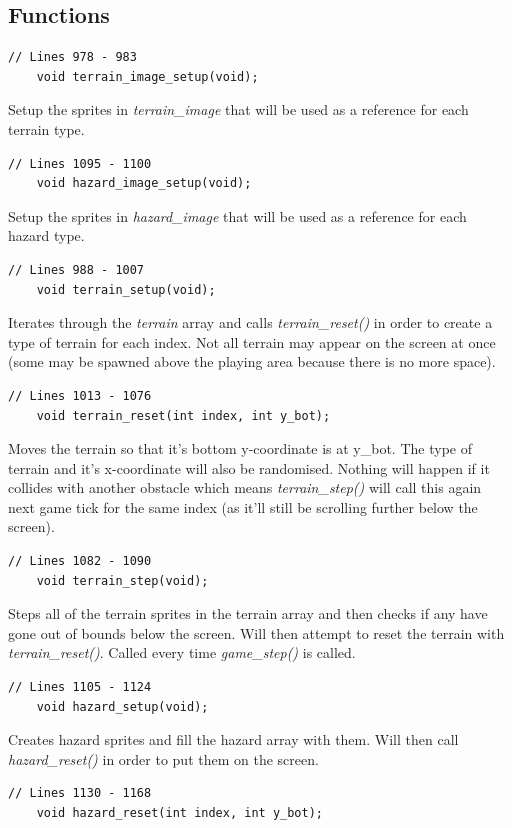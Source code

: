 \documentclass{article}
\begin{document}
\subsection*{Functions}
\begin{lstlisting}[style=CStyle]
	// Lines 978 - 983
	void terrain_image_setup(void);
\end{lstlisting}
Setup the sprites in \emph{terrain\_image} that will be used as a reference for each terrain type.
\begin{lstlisting}[style=CStyle]
	// Lines 1095 - 1100
	void hazard_image_setup(void);
\end{lstlisting}
Setup the sprites in \emph{hazard\_image} that will be used as a reference for each hazard type.
\begin{lstlisting}[style=CStyle]
	// Lines 988 - 1007
	void terrain_setup(void);
\end{lstlisting}
Iterates through the \emph{terrain} array and calls \emph{terrain\_reset()} in order to create a type of terrain for each index. Not all terrain may appear on the screen at once (some may be spawned above the playing area because there is no more space).
\begin{lstlisting}[style=CStyle]
	// Lines 1013 - 1076
	void terrain_reset(int index, int y_bot);
\end{lstlisting}
Moves the terrain so that it's bottom y-coordinate is at y\_bot. The type of terrain and it's x-coordinate will also be randomised. Nothing will happen if it collides with another obstacle which means \emph{terrain\_step()} will call this again next game tick for the same index (as it'll still be scrolling further below the screen).
\begin{lstlisting}[style=CStyle]
	// Lines 1082 - 1090
	void terrain_step(void);
\end{lstlisting}
Steps all of the terrain sprites in the terrain array and then checks if any have gone out of bounds below the screen. Will then attempt to reset the terrain with \emph{terrain\_reset()}. Called every time \emph{game\_step()} is called.
\begin{lstlisting}[style=CStyle]
	// Lines 1105 - 1124
	void hazard_setup(void);
\end{lstlisting}
Creates hazard sprites and fill the hazard array with them. Will then call \emph{hazard\_reset()} in order to put them on the screen.
\begin{lstlisting}[style=CStyle]
	// Lines 1130 - 1168
	void hazard_reset(int index, int y_bot);
\end{lstlisting}
\end{document}
